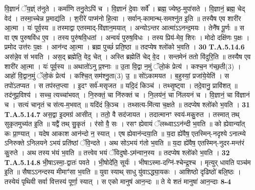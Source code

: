 \documentclass[17pt]{extarticle}
\begin{document}
                  वि॒ज्ञानं॑ ॅय॒ज्ञ्ं त॑नुते । कर्मा॑णि तनु॒तेऽपि॑ च । वि॒ज्ञानं॑ दे॒वाः सर्वे᳚ । ब्रह्म॒ ज्येष्ठ॒-मुपा॑सते । वि॒ज्ञानं॒ ब्रह्म॒ चेद् वेद॑ । तस्मा॒च्चेन्न प्र॒माद्य॑ति । श॒रीरे॑ पाप्म॑नो हि॒त्वा । सर्वान्-कामान्थ्-समश्नु॑त इ॒ति ॥ तस्यैष एव शारी॑र आ॒त्मा । यः॑ पूर्व॒स्य ॥ तस्माद्वा एतस्माद्-वि॑ज्ञान॒मयात् । अन्योऽन्तर आत्मा॑ऽऽनन्द॒मयः । तेनै॑ष पू॒र्णः ॥ स वा एष पुरुषवि॑ध ए॒व । तस्य पुरु॑षवि॒धतां ।  अन्वयं॑ पुरुष॒विधः । तस्य प्रिय॑-मेव॒ शिरः ।  मोदो दक्षि॑णः प॒क्षः ।  प्रमोद उत्त॑रः प॒क्षः । आन॑न्द आ॒त्मा ।  ब्रह्म पुच्छं॑ प्रति॒ष्ठा ॥  तदप्येष श्लो॑को भ॒वति । \textbf{ 30} \newline
                  \newline
                                                                  \textbf{ T.A.5.14.6} \newline
                  अस॑न्ने॒व स॑ भवति । अस॒द् ब्रह्मेति॒ वेद॒ चेत् ।  अस्ति ब्रह्मेति॑ चेद् वे॒द । सन्तमेनं ततो वि॑दुरि॒ति ॥ तस्यैष एव शारी॑र आ॒त्मा । यः॑ पूर्व॒स्य ॥ अथातो॑ऽनु प्र॒श्नाः ॥ उ॒ता वि॒द्वा न॒मुं ॅलो॒कं प्रेत्य॑ । कश्च॒न ग॑च्छ॒ती(3) । आहो॑ वि॒द्वान॒मुं ॅलो॒कं प्रेत्य॑ । कश्चि॒त् सम॑श्नु॒ता(3) उ॒ ॥ सो॑ऽकामयत ।  ब॒हुस्यां॒ प्रजा॑ये॒येति॑ । स तपो॑ऽतप्यत । स तप॑स्त॒प्त्वा । इ॒दꣳ सर्व॑-मसृजत ॥ यदि॒दं किञ्च॑ । तथ्सृ॒ष्ट्वा । तदे॒वानु॒ प्रावि॑शत् ॥ तद॑नुप्र॒विश्य॑ । सच्च॒ त्यच्चा॑भवत् । नि॒रुक्तं॒ चा नि॑रुक्तं च ।  नि॒लय॑नं॒ चा नि॑लयनं च । वि॒ज्ञानं॒ चा वि॑ज्ञानं च । सत्यं चानृतं च स॑त्य-म॒भवत् ॥ यदि॑दं कि॒ञ्च ।  तथ्सत्य-मि॑त्या च॒क्षते ॥ तदप्येष श्लो॑को भ॒वति । \textbf{ 31} \newline
                  \newline
                                                                  \textbf{ T.A.5.14.7} \newline
                  अस॒द्वा इ॒दमग्र॑ आसीत् । ततो॒ वै सद॑जायत ।  तदात्मानꣳ स्वय॑-मकु॒रुत । तस्मात् तथ् सुकृतमुच्य॑त इ॒ति ॥ यद्वै॑ तथ् सु॒कृतं । र॑सो वै॒ सः । रसꣳ ह्येवायं ॅलब्ध्वाऽऽन॑न्दी भ॒वति ॥ को ह्येवान्या᳚त् कः प्रा॒ण्यात् । यदेष आकाश आन॑न्दो न॒ स्यात् । एष ह्येवान॑न्दया॒ति ॥ य॒दा ह्ये॑वैष॒ एतस्मिन्-नदृश्ये ऽनात्म्ये ऽनिरुक्ते ऽनिलयने ऽभयं  प्रति॑ष्ठां ॅवि॒न्दते । अथ सोऽभयं ग॑तो भ॒वति ॥  य॒दा ह्ये॑वैष॒ एतस्मिन्-नुदर-मन्त॑रं कु॒रुते ।  अथ तस्य भ॑यं भ॒वति ॥ तत्त्वेव भयं ॅविदुषो-ऽम॑न्वान॒स्य ॥  तदप्येष श्लो॑को भ॒वति । \textbf{ 32} \newline
                  \newline
                                                                  \textbf{ T.A.5.14.8} \newline
                  भी॒षाऽस्मा॒-द्वातः॑ पवते । भी॒षोदे॑ति॒ सूर्यः॑ ।  भीषाऽस्मा-दग्नि॑-श्चेन्द्र॒श्च । मृत्युर् धावति पञ्च॑म इ॒ति ॥ सैषाऽऽनन्दस्य मीमाꣳ॑सा भ॒वति ॥ युवा स्याथ् साधु यु॑वाऽद्ध्या॒यकः । आशिष्ठो दृढिष्ठो॑ बलि॒ष्ठः । तस्येयं पृथिवी सर्वा वित्तस्य॑ पूर्णा॒ स्यात् ।  स एको मानुष॑ आन॒न्दः ॥ ते ये शतं मानुषा॑ आन॒न्दाः \textbf{ 8-4} \newline
\end{document}
